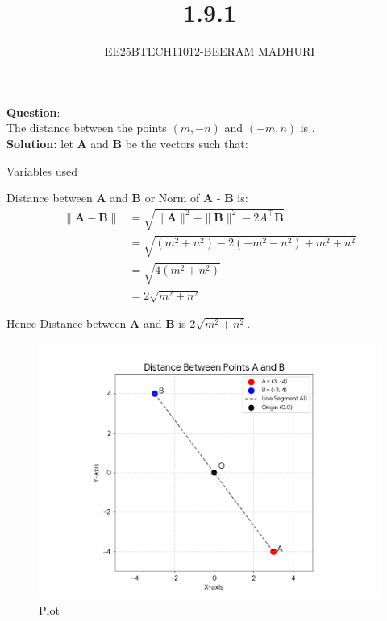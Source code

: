 \documentclass[journal]{IEEEtran}
\begin{document}

\vspace{3cm}

\title{1.9.1}
\author{EE25BTECH11012-BEERAM MADHURI}
{\let\newpage\relax\maketitle}

\renewcommand{\thefigure}{\theenumi}
\renewcommand{\thetable}{\theenumi}
\setlength{\intextsep}{10pt} %


\renewcommand{\thetable}{\theenumi}


\textbf{Question}:\\
The distance between the points $(m, -n)$ and $(-m, n)$ is \underline{\hspace{2cm}}.
\\
\textbf{Solution: }
let \textbf{A} and \textbf{B} be the vectors such that: 
\begin{table}[h!]
    \centering
    
    \caption{Variables used}
    \label{table 1.9.1}
\end{table}

Distance between \textbf{A} and \textbf{B} or Norm of \textbf{A} - \textbf{B} is:
\begin{align*}
\| \textbf{A} - \textbf{B} \| &= \sqrt{\|\textbf{A}\|^2 + \|\textbf{B}\|^2 - 2 A^\top\textbf{B} }\\
&= \sqrt{(m^2 + n^2) - 2(-m^2 - n^2) + m^2 + n^2} \\
&= \sqrt{4(m^2+n^2)} \\
&= 2\sqrt{m^2+n^2}
\end{align*}

Hence Distance between \textbf{A} and \textbf{B} is $2\sqrt{m^2+n^2}$.
\begin{figure}[h!]
    \centering
    \includegraphics[width=0.7\columnwidth]{figs/graph.png}
    \caption{Plot}
    \label{fig:placeholder}
\end{figure}
\end{document}
